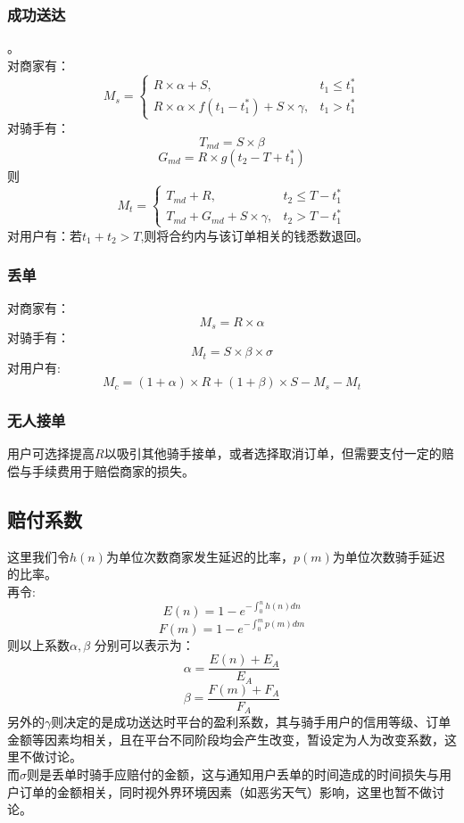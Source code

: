 \documentclass[UTF8]{ctexart}
\begin{document}
\begin{multicols}{2}
  \subsubsection{成功送达}
    。 \\
    \indent 对商家有：
    $$
    M_s=\left\{
      \begin{array}{lr}
        R \times \alpha + S,  & {t_1 \leq t_1^{*}}\\
        R \times \alpha \times f(t_1-t_1^{*}) + S \times \gamma, & {t_1 > t_1^{*}}
      \end{array}\right.
    $$
    \indent 对骑手有：\\
    $$T_{md} = S \times \beta $$
    $$ G_{md}=R \times g(t_2-T+t_1^{*})$$
    \indent 则
    $$
    M_t=\left\{
      \begin{array}{lr}
        T_{md}+R,  & {t_2 \leq T-t_1^{*}}\\
        T_{md} + G_{md} + S \times \gamma, & {t_2 > T -t_1^{*}}
      \end{array}\right.
    $$
    \indent 对用户有：若$t_1+t_2>T$,则将合约内与该订单相关的钱悉数退回。
  \subsubsection{丢单}

  \indent 对商家有：
  $$M_s=R \times \alpha $$
  \indent 对骑手有：
  $$M_t=S \times \beta \times \sigma$$
  \indent 对用户有:
  $$M_c=(1+\alpha)\times R +(1+\beta)\times S    -M_s-M_t$$
  \subsubsection{无人接单}
  \indent 用户可选择提高$R$以吸引其他骑手接单，或者选择取消订单，但需要支付一定的赔偿与手续费用于赔偿商家的损失。
  \subsection{赔付系数}
  \indent 这里我们令$h(n)$为单位次数商家发生延迟的比率，$p(m)$为单位次数骑手延迟的比率。\\
  \indent 再令:$$E(n)=1-e^{- \int_{0}^{n}h(n)dn}$$
  $$F(m)=1-e^{- \int_{0}^{m}p(m)dm}$$
  \indent 则以上系数$\alpha, \beta$ 分别可以表示为：
  $$\alpha = \frac{E(n)+E_A}{E_A}$$
  $$\beta = \frac{F(m)+F_A}{F_A}$$
  \indent 另外的$\gamma$则决定的是成功送达时平台的盈利系数，其与骑手用户的信用等级、订单金额等因素均相关，且在平台不同阶段均会产生改变，暂设定为人为改变系数，这里不做讨论。\\
  \indent 而$\sigma$则是丢单时骑手应赔付的金额，这与通知用户丢单的时间造成的时间损失与用户订单的金额相关，同时视外界环境因素（如恶劣天气）影响，这里也暂不做讨论。


\end{multicols}
\end{document}
